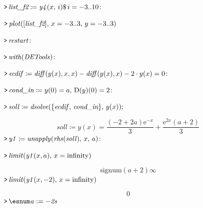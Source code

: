 \documentclass{article}
\begin{document}
\mapleinput
{$ \displaystyle \texttt{>\,} \textit{list\_f2} \coloneqq \mathit{y4} (x ,\,i)\$ \,i =-3..10\colon  $}

\mapleinput
{$ \displaystyle \texttt{>\,} \mathit{plot} ([\textit{list\_f2}],\,x =-3..3,\,y =-3..3) $}

{}
\mapleinput
{$ \displaystyle \texttt{>\,} \mathit{restart} \colon  $}

\mapleinput
{$ \displaystyle \texttt{>\,} \mathit{with} (\mathit{DETools})\colon  $}

\mapleinput
{$ \displaystyle \texttt{>\,} \mathit{ecdif} \coloneqq \mathit{diff} (y (x),x ,x)-\mathit{diff} (y (x),x)-2\cdot y (x)=0\colon  $}

\mapleinput
{$ \displaystyle \texttt{>\,} \textit{cond\_in} \coloneqq y (0)=a ,\,\mathrm{D}(y)(0)=2\colon  $}

\mapleinput
{$ \displaystyle \texttt{>\,} \mathit{soll} \coloneqq \mathit{dsolve} (\{\mathit{ecdif} ,\,\textit{cond\_in} \},\,y (x)); $}

\begin{dmath}\label{(31)}
\mathit{soll} \coloneqq y \! \left(x \right)=\frac{\left(-2+2 a \right) {\mathrm e}^{-x}}{3}+\frac{{\mathrm e}^{2 x} \left(a +2\right)}{3}
\end{dmath}
\mapleinput
{$ \displaystyle \texttt{>\,} \mathit{y1} \coloneqq \mathit{unapply} (\mathit{rhs} (\mathit{soll}),\,x ,\,a)\colon  $}

\mapleinput
{$ \displaystyle \texttt{>\,} \mathit{limit} (\mathit{y1} (x ,a),\,x =\mathrm{infinity}) $}

\begin{dmath}\label{(32)}
\mathrm{signum}\! \left(a +2\right) \infty 
\end{dmath}
\mapleinput
{$ \displaystyle \texttt{>\,} \mathit{limit} (\mathit{y1} (x ,-2),\,x =\mathrm{infinity}) $}

\begin{dmath}\label{(33)}
0
\end{dmath}
\mapleinput
{$ \displaystyle \texttt{>\,} \esnum \mathit{a:=-2s}  $}
\end{document}

